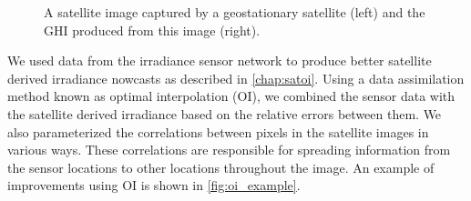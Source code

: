 \begin{figure}[htbp]
\caption[Satellite image and irradiance estimate]{A satellite image
  captured by a geostationary satellite (left) and the GHI produced
  from this image (right).}
\label{fig:satimage_example}
\end{figure}

We used data from the irradiance sensor network to produce better
satellite derived irradiance nowcasts as described in
\cref{chap:satoi}.
Using a data assimilation method known as optimal interpolation (OI),
we combined the sensor data with the satellite derived irradiance
based on the relative errors between them.
We also parameterized the correlations between pixels in the satellite
images in various ways.
These correlations are responsible for spreading information from the
sensor locations to other locations throughout the image.
An example of improvements using OI is shown in \cref{fig:oi_example}.


